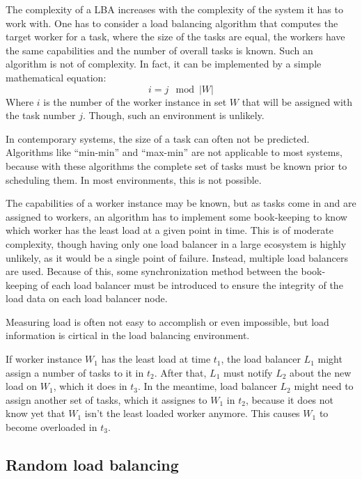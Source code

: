 The complexity of a \ac{LBA} increases with the complexity of the system it has
to work with.
One has to consider a load balancing algorithm that computes the target worker
for a task,
where the size of the tasks are equal, the workers have the same capabilities
and the number of overall tasks is known.
Such an algorithm is not of complexity.
In fact, it can be implemented by a simple mathematical equation:
\begin{equation}
    i = j \mod |W|
\end{equation}
Where $i$ is the number of the worker instance in set $W$ that will be assigned
with the task number $j$.
Though, such an environment is unlikely.

In contemporary systems, the size of a task can often not be predicted.
Algorithms like ``min-min'' and ``max-min''
\cite{anInDepthAnal} are not applicable to most systems, because
with these algorithms the complete set of tasks must be known prior to
scheduling them.
In most environments, this is not possible.

The capabilities of a worker instance may be known, but as tasks come in and are
assigned to workers, an algorithm has to implement some book-keeping to know
which worker has the least load at a given point in time.
This is of moderate complexity, though having only one load balancer in a large
ecosystem is highly unlikely, as it would be a single point of failure.
Instead, multiple load balancers are used.
Because of this, some synchronization method between the book-keeping of each
load balancer must be introduced to ensure the integrity of the load data on
each load balancer node.

Measuring load is often not easy to accomplish or even impossible, but load
information is cirtical in the load balancing environment\cite{detAnal}.

If worker instance $W_1$ has the least load at time $t_1$, the load balancer
$L_1$ might assign a number of tasks to it in $t_2$.
After that, $L_1$ must notify $L_2$ about the new load on $W_1$, which it does
in $t_3$.
In the meantime, load balancer $L_2$ might need to assign another set of tasks,
which it assignes to $W_1$ in $t_2$, because it does not know yet that $W_1$
isn't the least loaded worker anymore.
This causes $W_1$ to become overloaded in $t_3$.


\subsection{Random load balancing}

